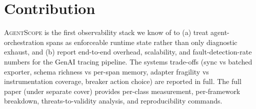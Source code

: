 \documentclass[sigplan,10pt,anonymous,review]{acmart}
\newcommand{\sysname}{\textsc{AgentScope}\xspace}
\begin{document}
\section*{Contribution}

\sysname{} is the first observability stack we know of to (a) treat
agent-orchestration spans as enforceable runtime state rather than
only diagnostic exhaust, and (b) report end-to-end overhead,
scalability, and fault-detection-rate numbers for the GenAI tracing
pipeline. The systems trade-offs (sync vs batched exporter, schema
richness vs per-span memory, adapter fragility vs instrumentation
coverage, breaker action choice) are reported in full. The full paper
(under separate cover) provides per-class measurement, per-framework
breakdown, threats-to-validity analysis, and reproducibility commands.
\end{document}

